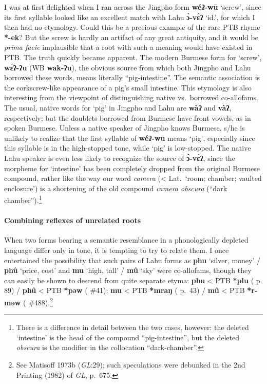 I was at first delighted when I ran across the Jingpho form \textbf{wéʔ-wū} ‘screw’,
since its first syllable looked like an excellent match with Lahu \textbf{ɔ̀-vɛ̀ʔ} ‘id.’,
for which I then had no etymology. Could this be a precious example of the rare
PTB rhyme \textbf{*-ek}? But the screw is hardly an artifact of any great antiquity, and
it would be \textit{prima facie} implausible that a root with such a meaning would have
existed in PTB. The truth quickly became apparent. The modern Burmese form for
‘screw’, \textbf{wɛ́ʔ-ʔu} (WB \textbf{wak-ʔu}), the obvious source from which both Jingpho and
Lahu borrowed these words, means literally “pig-intestine”.  The semantic
association is the corkscrew-like appearance of a pig’s small intestine. This
etymology is also interesting from the viewpoint of distinguishing native vs.\
borrowed co-allofams. The usual, native words for ‘pig’ in Jingpho and Lahu are
\textbf{wàʔ} and \textbf{vàʔ}, respectively; but the doublets borrowed from Burmese have front
vowels, as in spoken Burmese. Unless a native speaker of Jingpho knows Burmese,
s/he is unlikely to realize that the first syllable of \textbf{wéʔ-wū} means ‘pig’,
especially since this syllable is in the high-stopped tone, while ‘pig’ is
low-stopped. The native Lahu speaker is even less likely to recognize the source
of \textbf{ɔ̀-vɛ̀ʔ}, since the morpheme for ‘intestine’ has been completely dropped from
the original Burmese compound, rather like the way our word \textit{camera} (< Lat.\
‘room; chamber; vaulted enclosure’) is a shortening of the old compound \textit{camera
obscura} (“dark chamber”).\footnote{There is a difference in detail between the
two cases, however: the deleted ‘intestine’ is the head of the compound
“pig-intestine”, but the deleted \textit{obscura} is the modifier in the collocation
“dark-chamber”.}

\paragraph{Combining reflexes of unrelated roots}

When two forms bearing a semantic resemblance in a phonologically depleted
language differ only in tone, it is tempting to try to relate them. I once
entertained the possibility that such pairs of Lahu forms as \textbf{phu} ‘silver, money’
/ \textbf{phû} ‘price, cost’ and \textbf{mu} ‘high, tall’ / \textbf{mû} ‘sky’ were co-allofams, though they
can easily be shown to descend from quite separate etyma: \textbf{phu} < PTB \textbf{*plu} (\textit{} p.
89) / \textbf{phû} < PTB \textbf{*pəw} (\textit{\citetalias{STC}} \#41);
\textbf{mu} < PTB \textbf{*mraŋ} (\textit{\citetalias{STC}} p.~43) / \textbf{mû} < PTB \textbf{*r-məw}
(\textit{\citetalias{STC}} \#488).\footnote{See Matisoff 1973b (\textit{GL}:29); such speculations were debunked in
the 2nd Printing (1982) of \textit{GL}, p.~675.}

